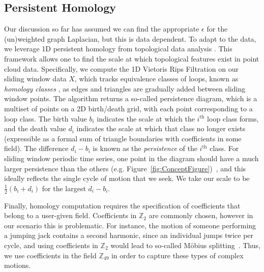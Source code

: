 \documentclass{article}
\begin{document}
\subsection{Persistent Homology}
Our discussion so far has assumed we can find the appropriate $\epsilon$ for the (un)weighted graph Laplacian, but this is data dependent.
To adapt to the data, we leverage 1D persistent homology from topological data analysis \cite{edelsbrunner2010computational}.  This framework allows one to find the scale at which topological features exist in point cloud data.  Specifically, we compute the 1D Vietoris Rips Filtration on our sliding window data $X$, which tracks equivalence classes of loops, known as {\em homology classes} \cite{Hatcher}, as edges and triangles are gradually added between sliding window points.  The algorithm returns a so-called persistence diagram, which is a multiset of points on a 2D birth/death grid, with each point corresponding to a loop class.  The birth value $b_i$ indicates the scale at which the $i^{\text{th}}$ loop class forms, and the death value $d_i$ indicates the scale at which that class no longer exists (expressible as a formal sum of triangle boundaries with coefficients in some field).  The difference $d_i - b_i$ is known as the {\em persistence} of the $i^{\text{th}}$ class.  For sliding window periodic time series, one point in the diagram should have a much larger persistence than the others (e.g. Figure~\ref{fig:ConceptFigure})~\cite{perea2015sliding,tralie2017quasi}, and this ideally reflects the single cycle of motion that we seek.  We take our scale to be $\frac{1}{2}(b_i + d_i)$ for the largest $d_i - b_i$. %

Finally, homology computation requires the specification of coefficients that belong to a user-given field. Coefficients in $\mathbb{Z}_2$ are commonly chosen, however in our scenario this is problematic. For instance, the motion of someone performing a jumping jack contains a second harmonic, since an individual jumps twice per cycle, and using coefficients in $\mathbb{Z}_2$ would lead to so-called M{\"o}bius splitting~\cite{traliemoebius}. Thus, we use coefficients in the field $\mathbb{Z}_{49}$ in order to capture these types of complex motions.

\end{document}
